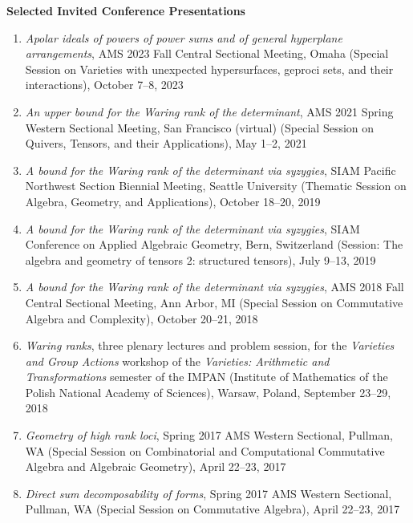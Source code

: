 \documentclass[12pt]{article}
\begin{document}
\textbf{Selected Invited Conference Presentations}
\begin{enumerate}[revarabic,labelwidth=*]

\item \textit{Apolar ideals of powers of power sums and of general hyperplane arrangements},
AMS 2023 Fall Central Sectional Meeting, Omaha
(Special Session on Varieties with unexpected hypersurfaces, geproci sets, and their interactions),
October 7--8, 2023

\item \textit{An upper bound for the Waring rank of the determinant},
AMS 2021 Spring Western Sectional Meeting, San Francisco (virtual)
(Special Session on Quivers, Tensors, and their Applications),
May 1--2, 2021

\item \textit{A bound for the Waring rank of the determinant via syzygies},
SIAM Pacific Northwest Section Biennial Meeting, Seattle University
(Thematic Session on Algebra, Geometry, and Applications),
October 18--20, 2019

\item \textit{A bound for the Waring rank of the determinant via syzygies},
SIAM Conference on Applied Algebraic Geometry, Bern, Switzerland
(Session: The algebra and geometry of tensors 2: structured tensors),
July 9--13, 2019

\item \textit{A bound for the Waring rank of the determinant via syzygies},
AMS 2018 Fall Central Sectional Meeting, Ann Arbor, MI
(Special Session on Commutative Algebra and Complexity),
October 20--21, 2018

\item \textit{Waring ranks},
three plenary lectures and problem session,
for the \emph{Varieties and Group Actions} workshop of the \emph{Varieties: Arithmetic and Transformations}
semester of the IMPAN (Institute of Mathematics of the Polish National Academy of Sciences),
Warsaw, Poland, September 23--29, 2018

\item \textit{Geometry of high rank loci},
Spring 2017 AMS Western Sectional, Pullman, WA
(Special Session on Combinatorial and Computational Commutative Algebra and Algebraic Geometry),
April 22--23, 2017

\item \textit{Direct sum decomposability of forms},
Spring 2017 AMS Western Sectional, Pullman, WA
(Special Session on Commutative Algebra),
April 22--23, 2017


\end{enumerate}
\end{document}
